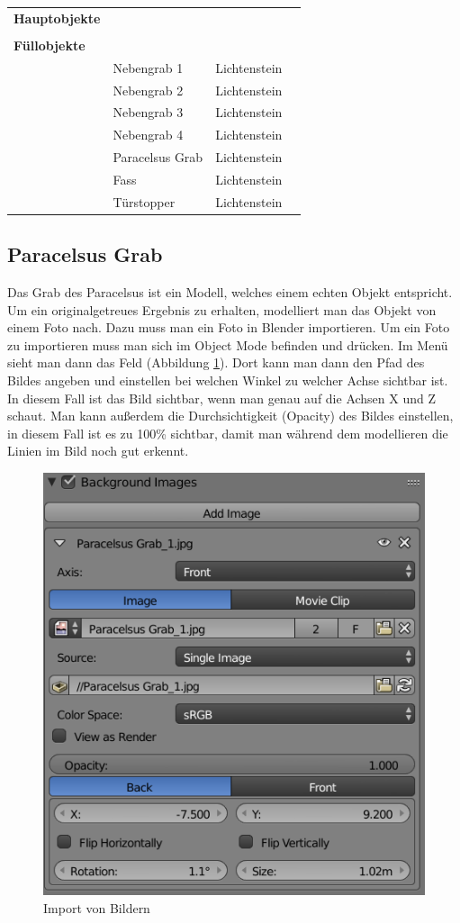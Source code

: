 \begin{tabular}{l|l|l|l}
    \hline
    \textbf{Hauptobjekte} &  &  & \\
    &  &  & \\
    \hline
    \textbf{Füllobjekte} &  &  & \\
    & Nebengrab 1 & Lichtenstein & \\
    & Nebengrab 2 & Lichtenstein & \\
    & Nebengrab 3 & Lichtenstein & \\
    & Nebengrab 4 & Lichtenstein & \\
    & Paracelsus Grab & Lichtenstein & \\
    & Fass & Lichtenstein & \\
    & Türstopper & Lichtenstein & \\
    \hline
\end{tabular}

\label{sec:Modellierung_von_3D_Objekten}
\subsection{Paracelsus Grab}
Das Grab des Paracelsus ist ein Modell, welches einem echten Objekt entspricht. Um ein originalgetreues Ergebnis zu erhalten,
modelliert man das Objekt von einem Foto nach. Dazu muss man ein Foto in Blender importieren. Um ein Foto zu importieren muss man sich im Object Mode befinden und 
drücken. Im Menü sieht man dann das Feld  (Abbildung \ref{Paracelsus_Grab:image1}). Dort kann man dann den Pfad des Bildes angeben
und einstellen bei welchen Winkel zu welcher Achse sichtbar ist. In diesem Fall ist das Bild sichtbar, wenn man genau auf die Achsen X und Z schaut. Man kann außerdem die
Durchsichtigkeit (Opacity) des Bildes einstellen, in diesem Fall ist es zu 100\% sichtbar, damit man während dem modellieren die Linien im Bild noch gut erkennt.

\raggedbottom
\begin{figure}[H]
    \centering
    \includegraphics[width=.8\textwidth]{images/Paracelsus-Grab_Import-von-Bildern.png}
    \caption{Import von Bildern}
    \label{Paracelsus_Grab:image1}
\end{figure}

